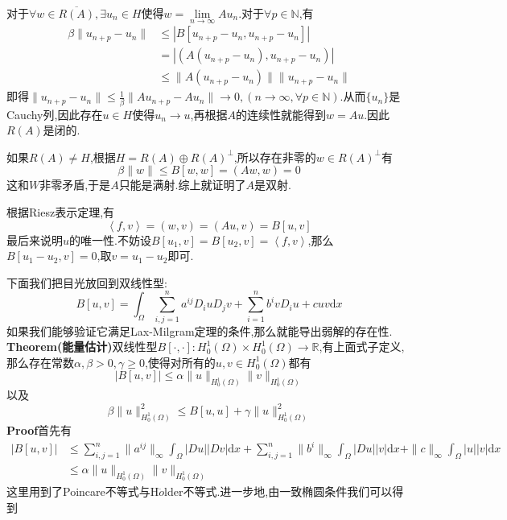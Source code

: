 \documentclass[a4paper,UTF8,12pt]{ctexart}
\begin{document}
对于$\forall w\in \overline{R(A)},\exists u_n\in H$使得$w=\lim\limits_{n\to\infty}Au_n$.对于$\forall p\in \mathbb{N}$,有
$$
\begin{aligned}
    \beta\|u_{n+p}-u_n\| &\leqslant |B[u_{n+p}-u_n,u_{n+p}-u_n]|\\
                         &= |(A(u_{n+p}-u_n),u_{n+p}-u_n)|\\
                         &\leqslant \|A(u_{n+p}-u_n)\|\|u_{n+p}-u_n\|
\end{aligned}
$$
即得$\|u_{n+p}-u_n\|\leqslant \frac{1}{\beta}\|Au_{n+p}-Au_n\|\to 0,(n\to \infty,\forall p\in\mathbb{N})$.从而$\{u_n\}$是Cauchy列,因此存在$u\in H$使得$u_n\to u$,再根据$A$的连续性就能得到$w=Au$.因此$R(A)$是闭的.\par
如果$R(A)\neq H$,根据$H=R(A)\oplus R(A)^{\bot }$,所以存在非零的$w\in R(A)^{\bot}$有
$$
\beta\|w\|\leqslant B[w,w]=(Aw,w)=0
$$
这和$W$非零矛盾,于是$A$只能是满射.综上就证明了$A$是双射.\par
根据Riesz表示定理,有
$$
\left\langle f,v \right\rangle=(w,v)=(Au,v)=B[u,v] 
$$
最后来说明$u$的唯一性.不妨设$B[u_1,v]=B[u_2,v]=\left\langle f,v \right\rangle $,那么$B[u_1-u_2,v]=0$,取$v=u_1-u_2$即可.\par
下面我们把目光放回到双线性型:
$$
B[u,v] = \int_\Omega \sum^n_{i,j=1}a^{ij}D_iu D_jv+\sum^n_{i=1}b^ivD_iu+cuv\mathrm{d}x
$$
如果我们能够验证它满足Lax-Milgram定理的条件,那么就能导出弱解的存在性.\\
\textbf{Theorem(能量估计)}\quad 双线性型$B[\cdot,\cdot]:H^1_0(\Omega)\times H^1_0(\Omega)\to \mathbb{R}$,有上面式子定义,那么存在常数$\alpha,\beta>0,\gamma\geqslant 0$,使得对所有的$u,v\in H^1_0(\Omega)$都有
\begin{equation}
    |B[u,v]|\leqslant \alpha\|u\|_{H^1_0(\Omega)}\|v\|_{H^1_0(\Omega)} \tag{i}
\end{equation}
以及
\begin{equation}
    \beta\|u\|^2_{H^1_0(\Omega)}\leqslant B[u,u]+\gamma\|u\|^2_{H^1_0(\Omega)} \tag{ii}
\end{equation}
\textbf{Proof}\quad 首先有
$$
\begin{aligned}
    |B[u,v]| &\leqslant \sum^n_{i,j=1}\|a^{ij}\|_{\infty}\int_{\Omega}|Du||Dv|\mathrm{d}x+\sum^n_{i,j=1}\|b^{i}\|_{\infty}\int_{\Omega}|Du||v|\mathrm{d}x+\|c\|_{\infty}\int_{\Omega}|u||v|\mathrm{d}x\\
             &\leqslant \alpha\|u\|_{H^1_0(\Omega)}\|v\|_{H^1_0(\Omega)}
\end{aligned}
$$
这里用到了Poincare不等式与H$\ddot{o}$lder不等式.进一步地,由一致椭圆条件我们可以得到
\end{document}
